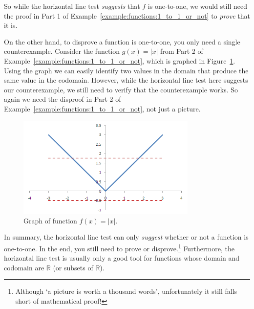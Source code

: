 \begin{rem}
So while the horizontal line test \emph{suggests} that $f$ is one-to-one, we would still need the proof in Part 1 of Example~\ref{example:functions:1_to_1_or_not} to \emph{prove} that it is.

On the other hand, to disprove a function is one-to-one, you only need a single counterexample.  Consider the function $g(x)= |x|$ from Part 2 of Example~\ref{example:functions:1_to_1_or_not}, which is graphed in Figure~\ref{fig:absx}.
Using the graph we can easily identify two values in the domain that produce the same value in the codomain.  However, while the horizontal line test here suggests our counterexample, we still need to verify that the counterexample works.  So again we need the disproof in Part 2 of Example~\ref{example:functions:1_to_1_or_not}, not just a picture.

\begin{figure}[h]
\includegraphics[width=3.5in]{images/absx.png}
\caption{Graph of function $f(x)=|x|$.}
\label{fig:absx}
\end{figure}

In summary, the horizontal line test can only \emph{suggest} whether or not a function is one-to-one. In the end, you still need to prove or disprove.\footnote{Although `a picture is worth a thousand words', unfortunately it still falls short of mathematical proof!}  Furthermore, the horizontal line test is usually only a good tool for functions whose domain and codomain are ${\mathbb R}$ (or subsets of ${\mathbb R}$).
\end{rem}    



